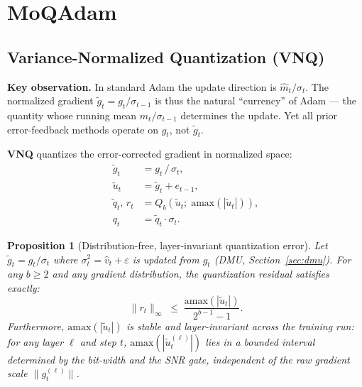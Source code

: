 \documentclass[10pt,twocolumn]{article}
\newtheorem{proposition}{Proposition}
\begin{document}
\section{MoQAdam}

\subsection{Variance-Normalized Quantization (VNQ)}
\label{sec:vnq}

\textbf{Key observation.}  In standard Adam the update direction is
$\hat{m}_t / \sigma_t$.  The normalized gradient
$\tilde{g}_t = g_t / \sigma_{t-1}$ is thus the natural ``currency''
of Adam — the quantity whose running mean $m_t / \sigma_{t-1}$
determines the update.  Yet all prior error-feedback methods operate
on $g_t$, not $\tilde{g}_t$.

\textbf{VNQ} quantizes the error-corrected gradient in normalized space:
\begin{align}
  \tilde{g}_t &= g_t \,/\, \sigma_t, \label{eq:normalize} \\
  \tilde{u}_t &= \tilde{g}_t + e_{t-1}, \label{eq:add_residual} \\
  \tilde{q}_t,\, r_t &= Q_b(\tilde{u}_t; \;\mathrm{amax}(|\tilde{u}_t|)),
    \label{eq:quantize} \\
  q_t         &= \tilde{q}_t \cdot \sigma_t. \label{eq:denormalize}
\end{align}

\begin{proposition}[Distribution-free, layer-invariant quantization error]
\label{prop:vnq_bound}
Let $\tilde{g}_t = g_t / \sigma_t$ where $\sigma_t^2 = \hat{v}_t +
\varepsilon$ is updated from $g_t$ (DMU, Section~\ref{sec:dmu}).
For any $b \ge 2$ and any gradient distribution, the quantization
residual satisfies exactly:
\begin{equation}
  \|r_t\|_\infty \;\le\; \frac{\mathrm{amax}(|\tilde{u}_t|)}{2^{b-1}-1}.
  \label{eq:residual_bound}
\end{equation}
Furthermore, $\mathrm{amax}(|\tilde{u}_t|)$ is \emph{stable and
layer-invariant} across the training run: for any layer $\ell$ and
step $t$, $\mathrm{amax}(|\tilde{u}_t^{(\ell)}|)$ lies in a bounded
interval determined by the bit-width and the SNR gate, independent of
the raw gradient scale $\|g_t^{(\ell)}\|$.
\end{proposition}
\end{document}
